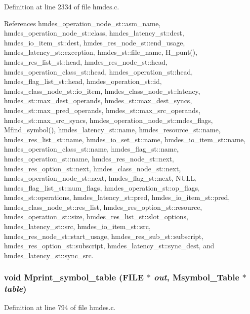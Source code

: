 Definition at line 2334 of file hmdes.c.

References hmdes\_\-operation\_\-node\_\-st::asm\_\-name, hmdes\_\-operation\_\-node\_\-st::class, hmdes\_\-latency\_\-st::dest, hmdes\_\-io\_\-item\_\-st::dest, hmdes\_\-res\_\-node\_\-st::end\_\-usage, hmdes\_\-latency\_\-st::exception, hmdes\_\-st::file\_\-name, H\_\-punt(), hmdes\_\-res\_\-list\_\-st::head, hmdes\_\-res\_\-node\_\-st::head, hmdes\_\-operation\_\-class\_\-st::head, hmdes\_\-operation\_\-st::head, hmdes\_\-flag\_\-list\_\-st::head, hmdes\_\-operation\_\-st::id, hmdes\_\-class\_\-node\_\-st::io\_\-item, hmdes\_\-class\_\-node\_\-st::latency, hmdes\_\-st::max\_\-dest\_\-operands, hmdes\_\-st::max\_\-dest\_\-syncs, hmdes\_\-st::max\_\-pred\_\-operands, hmdes\_\-st::max\_\-src\_\-operands, hmdes\_\-st::max\_\-src\_\-syncs, hmdes\_\-operation\_\-node\_\-st::mdes\_\-flags, Mfind\_\-symbol(), hmdes\_\-latency\_\-st::name, hmdes\_\-resource\_\-st::name, hmdes\_\-res\_\-list\_\-st::name, hmdes\_\-io\_\-set\_\-st::name, hmdes\_\-io\_\-item\_\-st::name, hmdes\_\-operation\_\-class\_\-st::name, hmdes\_\-flag\_\-st::name, hmdes\_\-operation\_\-st::name, hmdes\_\-res\_\-node\_\-st::next, hmdes\_\-res\_\-option\_\-st::next, hmdes\_\-class\_\-node\_\-st::next, hmdes\_\-operation\_\-node\_\-st::next, hmdes\_\-flag\_\-st::next, NULL, hmdes\_\-flag\_\-list\_\-st::num\_\-flags, hmdes\_\-operation\_\-st::op\_\-flags, hmdes\_\-st::operations, hmdes\_\-latency\_\-st::pred, hmdes\_\-io\_\-item\_\-st::pred, hmdes\_\-class\_\-node\_\-st::res\_\-list, hmdes\_\-res\_\-option\_\-st::resource, hmdes\_\-operation\_\-st::size, hmdes\_\-res\_\-list\_\-st::slot\_\-options, hmdes\_\-latency\_\-st::src, hmdes\_\-io\_\-item\_\-st::src, hmdes\_\-res\_\-node\_\-st::start\_\-usage, hmdes\_\-res\_\-sub\_\-st::subscript, hmdes\_\-res\_\-option\_\-st::subscript, hmdes\_\-latency\_\-st::sync\_\-dest, and hmdes\_\-latency\_\-st::sync\_\-src.
\subsubsection{\setlength{\rightskip}{0pt plus 5cm}void Mprint\_\-symbol\_\-table (FILE $\ast$ {\em out}, \bf{Msymbol\_\-Table} $\ast$ {\em table})}\label{hmdes_8h_e02a2eb880e45436edfaea7651aa8288}




Definition at line 794 of file hmdes.c.


